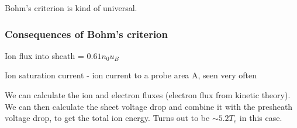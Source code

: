 \documentclass[PlasmaNotes.tex]{subfiles}
\begin{document}
Bohm's criterion is kind of universal.

\subsubsection{Consequences of Bohm's criterion}

Ion flux into sheath = $0.61 n_0 u_B$

Ion saturation current - ion current to a probe area A, seen very often

We can calculate the ion and electron fluxes (electron flux from kinetic theory). We can then calculate the sheet voltage drop and combine it with the presheath voltage drop, to get the total ion energy. Turns out to be $\sim 5.2 T_e$ in this case.
\end{document}
